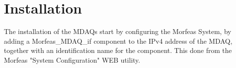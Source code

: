 \section{Installation}
The installation of the MDAQs start by configuring the Morfeas System, by adding a Morfeas\_MDAQ\_if component to the IPv4 address of the MDAQ,
together with an identification name for the component.
This done from the Morfeas "System Configuration" WEB utility.